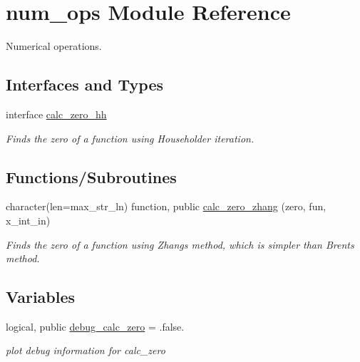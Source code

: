 \hypertarget{namespacenum__ops}{}\section{num\+\_\+ops Module Reference}
\label{namespacenum__ops}


Numerical operations.  


\subsection*{Interfaces and Types}
\begin{DoxyCompactItemize}
\item 
interface \hyperlink{interfacenum__ops_1_1calc__zero__hh}{calc\+\_\+zero\+\_\+hh}
\begin{DoxyCompactList}\small\item\em Finds the zero of a function using Householder iteration. \end{DoxyCompactList}\end{DoxyCompactItemize}
\subsection*{Functions/\+Subroutines}
\begin{DoxyCompactItemize}
\item 
character(len=max\+\_\+str\+\_\+ln) function, public \hyperlink{namespacenum__ops_adcc4eacf15c931744316a004f4448b90}{calc\+\_\+zero\+\_\+zhang} (zero, fun, x\+\_\+int\+\_\+in)
\begin{DoxyCompactList}\small\item\em Finds the zero of a function using Zhang\textquotesingle{}s method, which is simpler than Brent\textquotesingle{}s method. \end{DoxyCompactList}\end{DoxyCompactItemize}
\subsection*{Variables}
\begin{DoxyCompactItemize}
\item 
logical, public \hyperlink{namespacenum__ops_aca06cb91f215c46429e23fbaf8611e5a}{debug\+\_\+calc\+\_\+zero} = .false.
\begin{DoxyCompactList}\small\item\em plot debug information for calc\+\_\+zero \end{DoxyCompactList}\end{DoxyCompactItemize}


